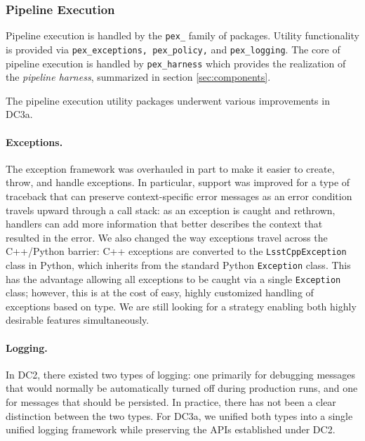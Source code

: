 
\subsubsection{Pipeline Execution} \label{sec:pex}

Pipeline execution is handled by the {\tt pex\_} family of packages.
Utility functionality is provided via {\tt pex\_exceptions,
pex\_policy,} and {\tt pex\_logging}.  The core of pipeline execution
is handled by {\tt pex\_harness} which provides the realization of the
{\it pipeline harness}, summarized in section \ref{sec:components}.


The pipeline execution utility packages underwent various
improvements in DC3a.

\paragraph{Exceptions.}  The exception framework was overhauled in
part to make it easier to create, throw, and handle exceptions.  In
particular, support was improved for a type of traceback that can preserve
context-specific error messages as an error condition travels upward
through a call stack: as an exception is caught and rethrown, handlers
can add more information that better describes the context that
resulted in the error.  We also changed the way exceptions travel
across the C++/Python barrier: C++ exceptions are converted to the
{\tt LsstCppException} class in Python, which inherits from the
standard Python {\tt Exception} class.  This has the advantage
allowing all exceptions to be caught via a single {\tt Exception}
class; however, this is at the cost of easy, highly customized
handling of exceptions based on type.  We are still looking for a
strategy enabling both highly desirable features simultaneously.  

\paragraph{Logging.}  In DC2, there existed two types of logging:  one
primarily for debugging messages that would normally be automatically
turned off during production runs, and one for messages that should be
persisted.  In practice, there has not been a clear distinction
between the two types.  For DC3a, we unified both types into a single
unified logging framework while preserving the APIs established under
DC2.  

